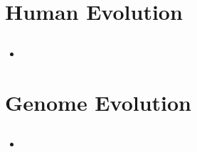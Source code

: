 \documentclass[12pt,a4paper]{article}
\begin{document}
\clearpage
\setcounter{section}{19}
\section{Human Evolution}
\subsection{}
\begin{itemize}
    \item 
\end{itemize}

\clearpage
\setcounter{section}{14}
\section{Genome Evolution}
\subsection{}
\begin{itemize}
    \item 
\end{itemize}
\end{document}
